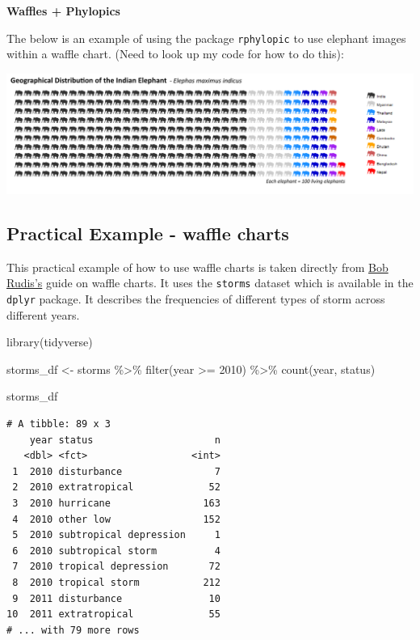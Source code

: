 \documentclass[
  letterpaper,
  DIV=11,
  numbers=noendperiod]{scrreprt}
\newenvironment{Shaded}{\begin{snugshade}}{\end{snugshade}}
\newcommand{\DecValTok}[1]{\textcolor[rgb]{0.68,0.00,0.00}{#1}}
\newcommand{\FunctionTok}[1]{\textcolor[rgb]{0.28,0.35,0.67}{#1}}
\newcommand{\NormalTok}[1]{\textcolor[rgb]{0.00,0.23,0.31}{#1}}
\newcommand{\OtherTok}[1]{\textcolor[rgb]{0.00,0.23,0.31}{#1}}
\newcommand{\SpecialCharTok}[1]{\textcolor[rgb]{0.37,0.37,0.37}{#1}}
\begin{document}
\textbf{Waffles + Phylopics}

The below is an example of using the package \texttt{rphylopic} to use
elephant images within a waffle chart. (Need to look up my code for how
to do this):

\includegraphics{./img/elephant.png}

\hypertarget{practical-example---waffle-charts}{%
\subsection{Practical Example - waffle
charts}\label{practical-example---waffle-charts}}

This practical example of how to use waffle charts is taken directly
from \href{https://rud.is/rpubs/building-waffle-charts.html}{Bob
Rudis's} guide on waffle charts. It uses the \texttt{storms} dataset
which is available in the \texttt{dplyr} package. It describes the
frequencies of different types of storm across different years.

\begin{Shaded}
\begin{Highlighting}[]
\FunctionTok{library}\NormalTok{(tidyverse)}

\NormalTok{storms\_df }\OtherTok{\textless{}{-}}\NormalTok{ storms }\SpecialCharTok{\%\textgreater{}\%}
  \FunctionTok{filter}\NormalTok{(year }\SpecialCharTok{\textgreater{}=} \DecValTok{2010}\NormalTok{) }\SpecialCharTok{\%\textgreater{}\%}
  \FunctionTok{count}\NormalTok{(year, status) }

\NormalTok{storms\_df}
\end{Highlighting}
\end{Shaded}

\begin{verbatim}
# A tibble: 89 x 3
    year status                     n
   <dbl> <fct>                  <int>
 1  2010 disturbance                7
 2  2010 extratropical             52
 3  2010 hurricane                163
 4  2010 other low                152
 5  2010 subtropical depression     1
 6  2010 subtropical storm          4
 7  2010 tropical depression       72
 8  2010 tropical storm           212
 9  2011 disturbance               10
10  2011 extratropical             55
# ... with 79 more rows
\end{verbatim}
\end{document}
